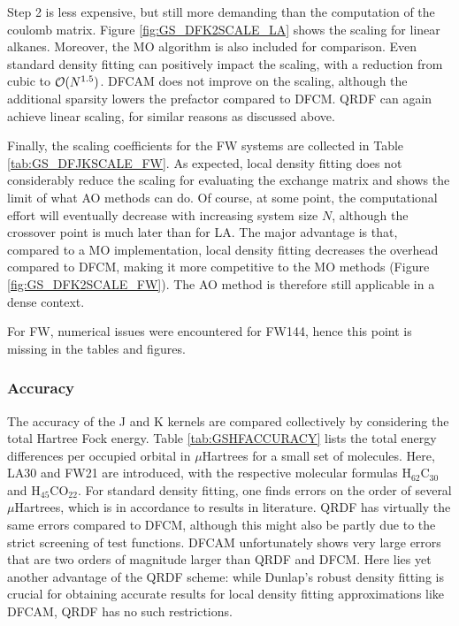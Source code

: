 Step 2 is less expensive, but still more demanding than the computation of the coulomb matrix. Figure \ref{fig:GS_DFK2SCALE_LA} shows the scaling for linear alkanes. Moreover, the MO algorithm is also included for comparison. Even standard density fitting can positively impact the scaling, with a reduction from cubic to $\mathcal{O}(N^{1.5})$. DFCAM does not improve on the scaling, although the additional sparsity lowers the prefactor compared to DFCM. QRDF can again achieve linear scaling, for similar reasons as discussed above. 



Finally, the scaling coefficients for the FW systems are collected in Table \ref{tab:GS_DFJKSCALE_FW}. As expected, local density fitting does not considerably reduce the scaling for evaluating the exchange matrix and shows the limit of what AO methods can do. Of course, at some point, the computational effort will eventually decrease with increasing system size $N$, although the crossover point is much later than for LA. The major advantage is that, compared to a MO implementation, local density fitting decreases the overhead compared to DFCM, making it more competitive to the MO methods (Figure \ref{fig:GS_DFK2SCALE_FW}). The AO method is therefore still applicable in a dense context. 

For FW, numerical issues were encountered for FW144, hence this point is missing in the tables and figures.

\subsubsection{Accuracy}

The accuracy of the J and K kernels are compared collectively by considering the total Hartree Fock energy. Table \ref{tab:GSHFACCURACY} lists the total energy differences per occupied orbital in $\mu$Hartrees for a small set of molecules. Here, LA30 and FW21 are introduced, with the respective molecular formulas H$_{62}$C$_{30}$ and H$_{45}$CO$_{22}$. For standard density fitting, one finds errors on the order of several $\mu$Hartrees, which is in accordance to results in literature. QRDF has virtually the same errors compared to DFCM, although this might also be partly due to the strict screening of test functions. DFCAM unfortunately shows very large errors that are two orders of magnitude larger than QRDF and DFCM. Here lies yet another advantage of the QRDF scheme: while Dunlap's robust density fitting is crucial for obtaining accurate results for local density fitting approximations like DFCAM, QRDF has no such restrictions. 

